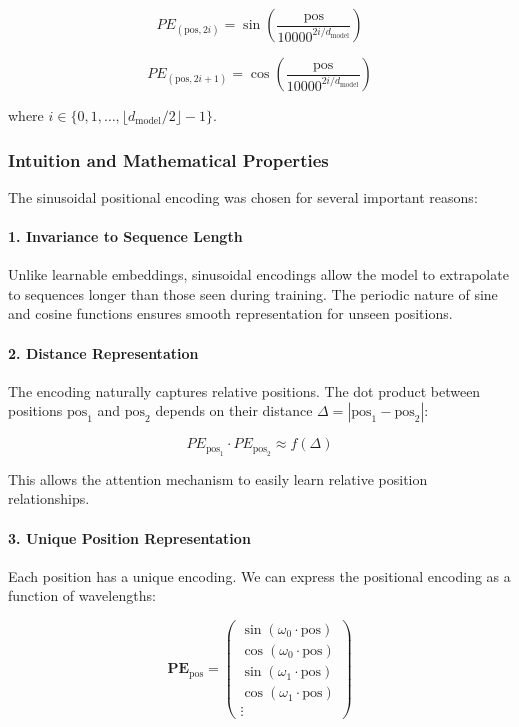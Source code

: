 \documentclass[11pt,a4paper]{article}
\begin{document}
\begin{equation}
PE_{(\text{pos}, 2i)} = \sin\left(\frac{\text{pos}}{10000^{2i/d_{\text{model}}}}\right)
\end{equation}

\begin{equation}
PE_{(\text{pos}, 2i+1)} = \cos\left(\frac{\text{pos}}{10000^{2i/d_{\text{model}}}}\right)
\end{equation}

where $i \in \{0, 1, \ldots, \lfloor d_{\text{model}}/2 \rfloor - 1\}$.

\subsubsection{Intuition and Mathematical Properties}

The sinusoidal positional encoding was chosen for several important reasons:

\paragraph{1. Invariance to Sequence Length}
Unlike learnable embeddings, sinusoidal encodings allow the model to extrapolate to sequences longer than those seen during training. The periodic nature of sine and cosine functions ensures smooth representation for unseen positions.

\paragraph{2. Distance Representation}
The encoding naturally captures relative positions. The dot product between positions $\text{pos}_1$ and $\text{pos}_2$ depends on their distance $\Delta = |\text{pos}_1 - \text{pos}_2|$:

\begin{equation}
PE_{\text{pos}_1} \cdot PE_{\text{pos}_2} \approx f(\Delta)
\end{equation}

This allows the attention mechanism to easily learn relative position relationships.

\paragraph{3. Unique Position Representation}
Each position has a unique encoding. We can express the positional encoding as a function of wavelengths:

\begin{equation}
\mathbf{PE}_{\text{pos}} = \begin{pmatrix}
\sin(\omega_0 \cdot \text{pos}) \\
\cos(\omega_0 \cdot \text{pos}) \\
\sin(\omega_1 \cdot \text{pos}) \\
\cos(\omega_1 \cdot \text{pos}) \\
\vdots
\end{pmatrix}
\end{equation}
\end{document}
